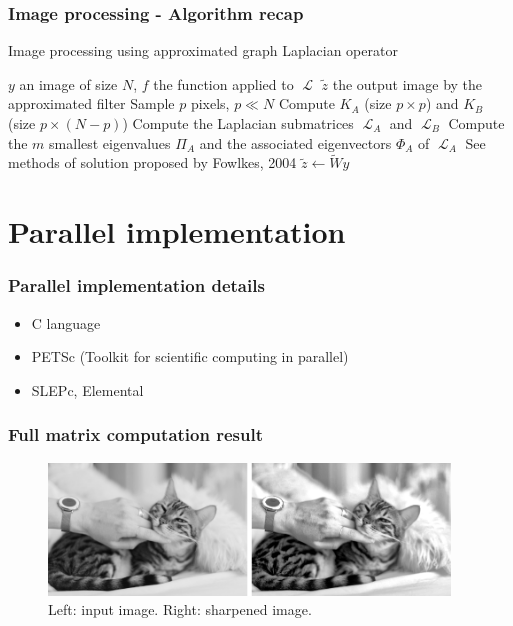 \documentclass{beamer}
\DeclareMathOperator{\Lapl}{\mathcal{L}}
\begin{document}
\begin{frame}
 \frametitle{Image processing - Algorithm recap}
  \begin{algorithm}[H]
   \caption{Image processing using approximated graph Laplacian operator}
   \begin{algorithmic}
    \REQUIRE \(y\) an image of size \(N\), \(f\) the function applied to \(\Lapl\)
    \ENSURE \(\tilde{z}\) the output image by the approximated filter
    \STATE {}
    \STATE Sample \(p\) pixels, \(p \ll N\)
    \STATE {}
    \STATE Compute \(K_A\) (size \(p \times p\)) and \(K_B\) (size \(p \times (N-p)\))
    \STATE Compute the Laplacian submatrices \(\Lapl_A\) and \(\Lapl_B\)
    \STATE {}
    \STATE Compute the \(m\) smallest eigenvalues \(\Pi_A\) and the associated eigenvectors \(\Phi_A\) of \(\Lapl_A\)
    \STATE {}
    \STATE See methods of solution proposed by Fowlkes, 2004
    \STATE \(\tilde{z} \leftarrow \tilde{W} y\)
   \end{algorithmic}
\end{algorithm}
\end{frame}


\section[Section]{Parallel implementation}

\begin{frame}
 \frametitle{Parallel implementation details}
 \begin{itemize}
  \item C language
  \item PETSc (Toolkit for scientific computing in parallel)
  \item SLEPc, Elemental
 \end{itemize}
\end{frame}

\begin{frame}
 \frametitle{Full matrix computation result}
 \begin{figure}[H]
  \centering
  \includegraphics[width=0.95\textwidth]{../master_thesis/img/cat.png}
  \caption{Left: input image. Right: sharpened image.}
 \end{figure}
\end{frame}
\end{document}
